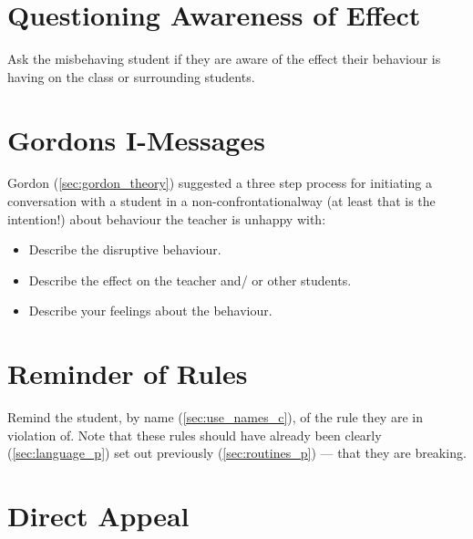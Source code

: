 \documentclass[12pt]{report}
\begin{document}



\section{Questioning Awareness of Effect}
\label{sec:questioning_c}

Ask the misbehaving student if they are aware of the effect their behaviour is having on the class or surrounding students\footnotemark.



\section{Gordons I-Messages}
\label{sec:i_messages_c}

Gordon (\ref{sec:gordon_theory}) suggested a three step process for initiating a conversation with a student in a non-confrontational\footnotemark[\value{footnote}] way (at least that is the intention!)  about behaviour the teacher is unhappy with:
\begin{itemize}
  \item Describe the disruptive behaviour.
  \item Describe the effect on the teacher and/ or other students.
  \item Describe your feelings about the behaviour.
\end{itemize}



\section{Reminder of Rules}
\label{sec:reminder_c}

Remind the student, by name (\ref{sec:use_names_c}), of the rule they are in violation of. Note that these rules should have already been clearly (\ref{sec:language_p}) set out previously (\ref{sec:routines_p}) --- that they are breaking\footnotemark[\value{footnote}].



\section{Direct Appeal}
\label{sec:direct_appeal_c}
\end{document}
